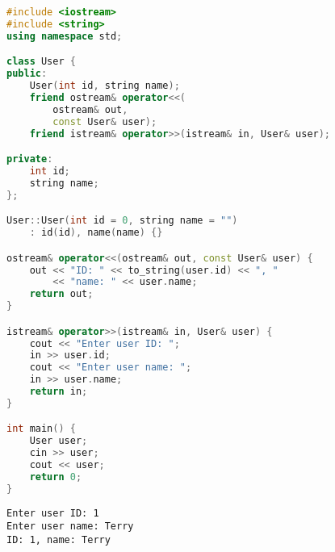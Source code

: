 
\begin{lstlisting}[language=C++]
#include <iostream>
#include <string>
using namespace std;

class User {
public:
    User(int id, string name);
    friend ostream& operator<<(
        ostream& out,
        const User& user);
    friend istream& operator>>(istream& in, User& user);

private:
    int id;
    string name;
};

User::User(int id = 0, string name = "")
    : id(id), name(name) {}

ostream& operator<<(ostream& out, const User& user) {
    out << "ID: " << to_string(user.id) << ", "
        << "name: " << user.name;
    return out;
}

istream& operator>>(istream& in, User& user) {
    cout << "Enter user ID: ";
    in >> user.id;
    cout << "Enter user name: ";
    in >> user.name;
    return in;
}

int main() {
    User user;
    cin >> user;
    cout << user;
    return 0;
}
\end{lstlisting}

\begin{tcolorbox}
	\begin{verbatim}
Enter user ID: 1
Enter user name: Terry
ID: 1, name: Terry
	\end{verbatim}
\end{tcolorbox}

\newpage